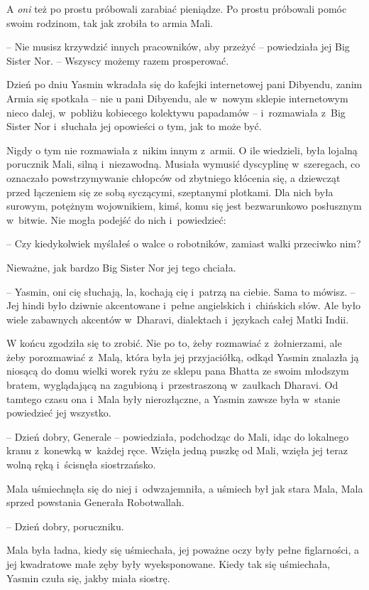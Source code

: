\documentclass[oneside,polish,11pt,rmheadings]{mwbk}
\begin{document}
A \textit{oni }też po prostu próbowali zarabiać pieniądze. Po prostu próbowali pomóc swoim rodzinom, tak jak zrobiła to armia Mali. 

-- Nie musisz krzywdzić innych pracowników, aby przeżyć -- powiedziała jej Big Sister Nor. -- Wszyscy możemy razem prosperować.

Dzień po dniu Yasmin wkradała się do kafejki internetowej pani Dibyendu, zanim Armia się spotkała -- nie u pani Dibyendu, ale w~nowym sklepie internetowym nieco dalej, w~pobliżu kobiecego kolektywu papadamów -- i~rozmawiała z~Big Sister Nor i~słuchała jej opowieści o tym, jak to może być.

Nigdy o tym nie rozmawiała z~nikim innym z~armii. O ile wiedzieli, była lojalną porucznik Mali, silną i~niezawodną. Musiała wymusić dyscyplinę w~szeregach, co oznaczało powstrzymywanie chłopców od zbytniego kłócenia się, a dziewcząt przed łączeniem się ze sobą syczącymi, szeptanymi plotkami. Dla nich była surowym, potężnym wojownikiem, kimś, komu się jest bezwarunkowo posłusznym w~bitwie. Nie mogła podejść do nich i~powiedzieć: 

-- Czy kiedykolwiek myślałeś o walce o robotników, zamiast walki przeciwko nim?

Nieważne, jak bardzo Big Sister Nor jej tego chciała.

-- Yasmin, oni cię słuchają, la, kochają cię i~patrzą na ciebie. Sama to mówisz. -- Jej hindi było dziwnie akcentowane i~pełne angielskich i~chińskich słów. Ale było wiele zabawnych akcentów w~Dharavi, dialektach i~językach całej Matki Indii.

W końcu zgodziła się to zrobić. Nie po to, żeby rozmawiać z~żołnierzami, ale żeby porozmawiać z~Malą, która była jej przyjaciółką, odkąd Yasmin znalazła ją niosącą do domu wielki worek ryżu ze sklepu pana Bhatta ze swoim młodszym bratem, wyglądającą na zagubioną i~przestraszoną w~zaułkach Dharavi. Od tamtego czasu ona i~Mala były nierozłączne, a Yasmin zawsze była w~stanie powiedzieć jej wszystko.

-- Dzień dobry, Generale -- powiedziała, podchodząc do Mali, idąc do lokalnego kranu z~konewką w~każdej ręce. Wzięła jedną puszkę od Mali, wzięła jej teraz wolną ręką i~ścisnęła siostrzańsko.

Mala uśmiechnęła się do niej i~odwzajemniła, a uśmiech był jak stara Mala, Mala sprzed powstania Generała Robotwallah. 

-- Dzień dobry, poruczniku. 

 Mala była ładna, kiedy się uśmiechała, jej poważne oczy były pełne figlarności, a jej kwadratowe małe zęby były wyeksponowane. Kiedy tak się uśmiechała, Yasmin czuła się, jakby miała siostrę.
\end{document}
